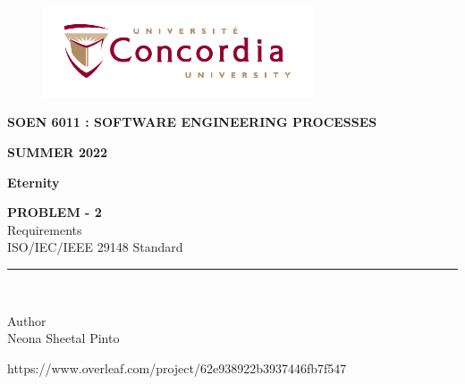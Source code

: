 \documentclass[letterpaper, 11pt]{article}
\begin{document}
\begin{titlepage}
\vspace*{0.7in}
\begin{center}
\begin{figure}[htb]
\begin{center}
\includegraphics[width=8cm]{univ_logo}
\end{center}
\end{figure}
\vspace*{0.3in}
\begin{Large}
\textbf{SOEN 6011 : SOFTWARE ENGINEERING PROCESSES} \\
\end{Large}
\vspace*{0.1in}
\begin{Large}
\textbf{SUMMER 2022} \\
\end{Large}
\vspace*{0.9in}
\begin{Large}
\textbf{Eternity} \\
\end{Large}
\vspace*{0.625in}
\begin{Large} 


\textbf{PROBLEM - 2} \\
\vspace*{0.2in}
Requirements
\vspace*{0.1in}
\\\footnotesize{ISO/IEC/IEEE} 29148 Standard \\
\end{Large}
\vspace*{0.625in}
\rule{80mm}{0.1mm}\\
\vspace*{0.1in}
\begin{large}
Author \\
\vspace*{0.1in}
Neona Sheetal Pinto\\
\vspace*{1.0in}
\date{\normalsize\today} 
\end{large}
\end{center}
\begin{center}
https://www.overleaf.com/project/62e938922b3937446fb7f547\end{center}
\end{titlepage}
\end{document}
